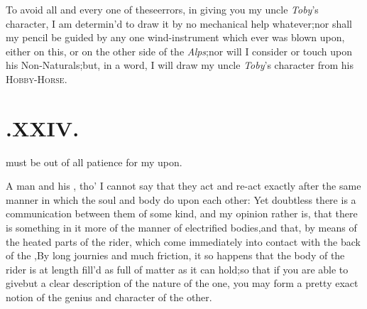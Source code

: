 \documentclass{article}
\begin{document}
To avoid all and every one of these\break errors, in giving you my
uncle \textit{Toby}’s character, I am determin’d to draw it
by
no mechanical help whatever;\tsh  nor shall my pencil be guided by
any one wind-instrument which ever was blown upon, either on this,
or on the other side of the \textit{Alps};\tsk  nor will I
consider\break
{}
or touch upon his
Non-Naturals;\tsk but, in a word, I will draw my uncle
\textit{Toby}’s character from his
\textsc{Hobby-Horse}.

\bigskip

\section{.\enspace XXIV.}

  must be out of all patience for my\break
{}
\break 
upon.

A man and his ,\break
tho’ I cannot say that they act and re-act exactly after the
same manner in which the soul and body do upon each other: Yet
doubtless there is a communication between them of some kind, and
my\break
opinion rather is, that there is something in it more of the
manner of electrified bodies,\tsk  and that, by means of the
heated parts of the rider, which come immediately into contact with
the back of the ,\tsk  By
long journies and much friction, it so happens that the bo\-dy of
the rider is at length fill’d as full of
 matter as it can
hold;\tsk  so that if you are able to give\break but a clear description of the nature
of the one, you may form a pretty exact notion of the genius and
character of the other.
\end{document}
